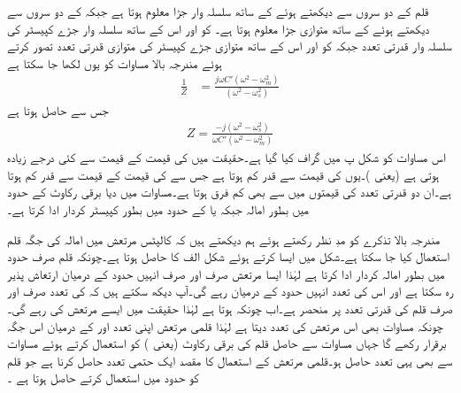 قلم کے دو سروں سے دیکھتے ہوئے  کے ساتھ  سلسلہ وار جڑا معلوم ہوتا ہے جبکہ  کے دو سروں سے دیکھتے ہوئے  کے ساتھ  متوازی جڑا معلوم ہوتا ہے۔ کو  اور اس کے ساتھ سلسلہ وار جڑے کپیسٹر  کی سلسلہ وار قدرتی تعدد جبکہ   کو  اور اس کے ساتھ متوازی جڑے کپیسٹر  کی متوازی قدرتی تعدد تصور کرتے ہوئے مندرجہ بالا مساوات کو یوں لکھا جا سکتا ہے
\begin{align*}
\frac{1}{Z}&=\frac{j \omega C'  \left(\omega^2 -\omega_m^2 \right)}{\left(\omega^2 -\omega_s^2 \right)}
\end{align*}
جس سے حاصل ہوتا ہے
\begin{align} \label{مساوات_مرتعش_قلم_رکاوٹ}
Z=\frac{-j \left(\omega^2 -\omega_s^2 \right)}{\omega C'  \left(\omega^2 -\omega_m^2 \right)}
\end{align}
اس مساوات کو شکل  پ میں گراف کیا گیا ہے۔حقیقت میں  کی قیمت  کے قیمت سے کئی درجے زیادہ ہوتی ہے (یعنی )۔یوں  کی قیمت  سے قدر کم  ہوتا ہے جس سے  کی قیمت  کے قیمت سے قدر کم ہوتا ہے۔ان دو قدرتی تعدد کی قیمتوں میں  سے بھی کم فرق ہوتا ہے۔مساوات  میں دیا برقی رکاوٹ  کے حدود میں بطور امالہ جبکہ  یا  کے حدود میں بطور کپیسٹر  کردار ادا کرتا ہے۔

مندرجہ بالا تذکرے کو مدِ نظر رکھتے ہوئے ہم دیکھتے ہیں کہ کالپٹس مرتعش میں امالہ کی جگہ قلم استعمال کیا جا سکتا ہے۔شکل  میں ایسا کرتے ہوئے  شکل  الف کا  حاصل ہوتا ہے۔چونکہ قلم صرف  حدود میں بطور امالہ کردار ادا کرتا ہے لہٰذا ایسا مرتعش صرف اور صرف انہیں حدود کے درمیان ارتعاش پذیر رہ سکتا ہے اور اس کی تعدد انہیں حدود کے درمیان رہے گی۔آپ دیکھ سکتے ہیں کہ  کی تعدد صرف اور صرف قلم کی قدرتی تعدد پر منحصر ہے۔اب چونکہ  ہوتا ہے لہٰذا حقیقت میں ایسے مرتعش کی   رہے گی۔چونکہ مساوات  بھی اس مرتعش کی تعدد دیتا ہے لہٰذا قلمی مرتعش اپنی تعدد  اور  کے درمیان اس جگہ برقرار رکھے گا جہاں مساوات  سے حاصل قلم کی  برقی رکاوٹ (یعنی ) کو استعمال کرتے ہوئے مساوات  سے بھی یہی تعدد حاصل ہو۔قلمی مرتعش کے استعمال کا مقصد ایک حتمی تعدد حاصل کرنا ہے جو قلم کو  حدود میں استعمال کرتے حاصل ہوتا ہے ۔


